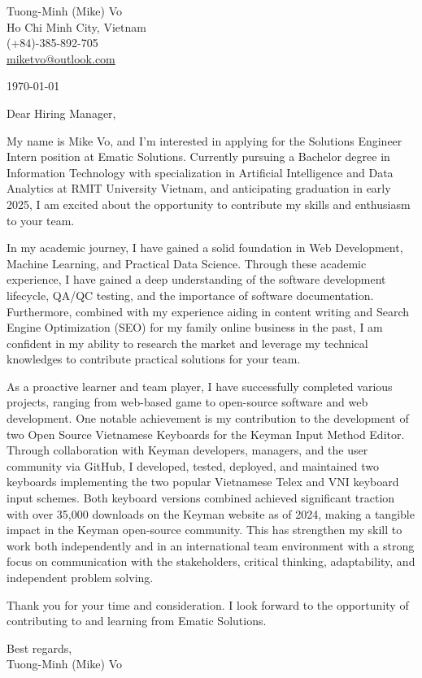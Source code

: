 \documentclass[a4paper,11pt]{article}
\makeatletter
\newcommand{\header}{
    \small{
        Tuong-Minh (Mike) Vo\\
        Ho Chi Minh City, Vietnam\\
        (+84)-385-892-705\\
        \href{miketvo@outlook.com}{miketvo@outlook.com}
    }
    \par\noindent\hrulefill
}
\newcommand{\p}[1]{#1\\\vspace{6pt}}
\makeatother
\begin{document}
\header

\p{\today}

\p{Dear Hiring Manager,}

\p{My name is Mike Vo, and I'm interested in applying for the Solutions Engineer Intern position at Ematic Solutions. Currently pursuing a Bachelor degree in Information Technology with specialization in Artificial Intelligence and Data Analytics at RMIT University Vietnam, and anticipating graduation in early 2025, I am excited about the opportunity to contribute my skills and enthusiasm to your team.}

\p{In my academic journey, I have gained a solid foundation in Web Development, Machine Learning, and Practical Data Science. Through these academic experience, I have gained a deep understanding of the software development lifecycle, QA/QC testing, and the importance of software documentation. Furthermore, combined with my experience aiding in content writing and Search Engine Optimization (SEO) for my family online business in the past, I am confident in my ability to research the market and leverage my technical knowledges to contribute practical solutions for your team.}

\p{As a proactive learner and team player, I have successfully completed various projects, ranging from web-based game to open-source software and web development. One notable achievement is my contribution to the development of two Open Source Vietnamese Keyboards for the Keyman Input Method Editor. Through collaboration with Keyman developers, managers, and the user community via GitHub, I developed, tested, deployed, and maintained two keyboards implementing the two popular Vietnamese Telex and VNI keyboard input schemes. Both keyboard versions combined achieved significant traction with over 35,000 downloads on the Keyman website as of 2024, making a tangible impact in the Keyman open-source community. This has strengthen my skill to work both independently and in an international team environment with a strong focus on communication with the stakeholders, critical thinking, adaptability, and independent problem solving.}

\p{Thank you for your time and consideration. I look forward to the opportunity of contributing to and learning from Ematic Solutions.}

\p{Best regards,\\
Tuong-Minh (Mike) Vo}
\end{document}

